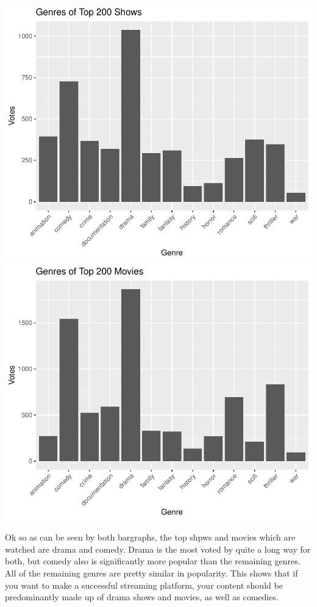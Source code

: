 \documentclass[11pt,preprint, authoryear]{elsarticle}
\numberwithin{equation}{section}
\numberwithin{figure}{section}
\numberwithin{table}{section}
\begin{document}
\includegraphics{Question_4_files/figure-latex/unnamed-chunk-4-1.pdf}
\includegraphics{Question_4_files/figure-latex/unnamed-chunk-4-2.pdf}

Ok so as can be seen by both bargraphs, the top shpws and movies which
are watched are drama and comedy. Drama is the most voted by quite a
long way for both, but comedy also is significantly more popular than
the remaining genres. All of the remaining genres are pretty similar in
popularity. This shows that if you want to make a successful streaming
platform, your content should be predominantly made up of drama shows
and movies, as well as comedies.


\end{document}
